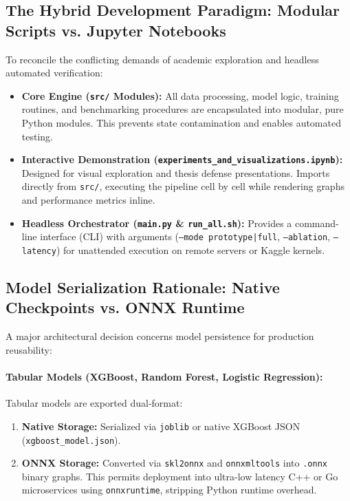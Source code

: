 \documentclass[11pt,a4paper]{article}
\begin{document}
\subsection{The Hybrid Development Paradigm: Modular Scripts vs. Jupyter Notebooks}
To reconcile the conflicting demands of academic exploration and headless automated verification:
\begin{itemize}[leftmargin=*]
    \item \textbf{Core Engine (\texttt{src/} Modules):} All data processing, model logic, training routines, and benchmarking procedures are encapsulated into modular, pure Python modules. This prevents state contamination and enables automated testing.
    \item \textbf{Interactive Demonstration (\texttt{experiments\_and\_visualizations.ipynb}):} Designed for visual exploration and thesis defense presentations. Imports directly from \texttt{src/}, executing the pipeline cell by cell while rendering graphs and performance metrics inline.
    \item \textbf{Headless Orchestrator (\texttt{main.py} \& \texttt{run\_all.sh}):} Provides a command-line interface (CLI) with arguments (\texttt{--mode prototype|full}, \texttt{--ablation}, \texttt{--latency}) for unattended execution on remote servers or Kaggle kernels.
\end{itemize}

\subsection{Model Serialization Rationale: Native Checkpoints vs. ONNX Runtime}
A major architectural decision concerns model persistence for production reusability:

\paragraph{Tabular Models (XGBoost, Random Forest, Logistic Regression):}
Tabular models are exported dual-format:
\begin{enumerate}
    \item \textbf{Native Storage:} Serialized via \texttt{joblib} or native XGBoost JSON (\texttt{xgboost\_model.json}).
    \item \textbf{ONNX Storage:} Converted via \texttt{skl2onnx} and \texttt{onnxmltools} into \texttt{.onnx} binary graphs. This permits deployment into ultra-low latency C++ or Go microservices using \texttt{onnxruntime}, stripping Python runtime overhead.
\end{enumerate}
\end{document}
